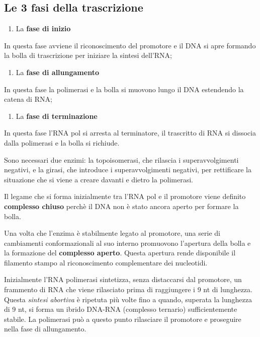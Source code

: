\documentclass[11pt]{book}
\begin{document}
\subsection{Le 3 fasi della
trascrizione}\label{le-3-fasi-della-trascrizione}

\begin{enumerate}
\def\labelenumi{\arabic{enumi}.}
\itemsep1pt\parskip0pt
\item
  La \textbf{fase di inizio}
\end{enumerate}

In questa fase avviene il riconoscimento del promotore e il DNA si apre
formando la bolla di trascrizione per iniziare la sintesi dell'RNA;

\begin{enumerate}
\def\labelenumi{\arabic{enumi}.}
\setcounter{enumi}{1}
\itemsep1pt\parskip0pt
\item
  La \textbf{fase di allungamento}
\end{enumerate}

In questa fase la polimerasi e la bolla si muovono lungo il DNA
estendendo la catena di RNA;

\begin{enumerate}
\def\labelenumi{\arabic{enumi}.}
\setcounter{enumi}{2}
\itemsep1pt\parskip0pt
\item
  La \textbf{fase di terminazione}
\end{enumerate}

In questa fase l'RNA pol si arresta al terminatore, il trascritto di RNA
si dissocia dalla polimerasi e la bolla si richiude.

Sono necessari due enzimi: la topoisomerasi, che rilascia i
superavvolgimenti negativi, e la girasi, che introduce i
superavvolgimenti negativi, per rettificare la situazione che si viene a
creare davanti e dietro la polimerasi.

Il legame che si forma inizialmente tra l'RNA pol e il promotore viene
definito \textbf{complesso chiuso} perchè il DNA non è stato ancora
aperto per formare la bolla.

Una volta che l'enzima è stabilmente legato al promotore, una serie di
cambiamenti conformazionali al suo interno promuovono l'apertura della
bolla e la formazione del \textbf{complesso aperto}. Questa apertura
rende disponibile il filamento stampo al riconoscimento complementare
dei nucleotidi.

Inizialmente l'RNA polimerasi sintetizza, senza distaccarsi dal
promotore, un frammento di RNA che viene rilasciato prima di raggiungere
i 9 nt di lunghezza. Questa \emph{sintesi abortiva} è ripetuta più volte
fino a quando, superata la lunghezza di 9 nt, si forma un ibrido DNA-RNA
(complesso ternario) sufficientemente stabile. La polimerasi può a
questo punto rilasciare il promotore e proseguire nella fase di
allungamento.
\end{document}
